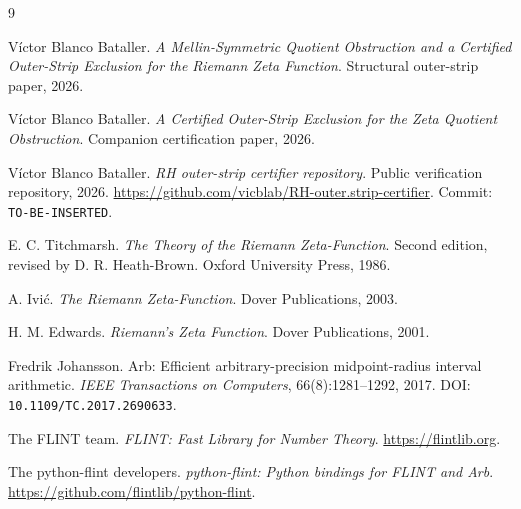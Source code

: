 \documentclass[11pt]{article}
\newcommand{\RepoURL}{\url{https://github.com/vicblab/RH-outer.strip-certifier}}
\begin{document}
\begin{thebibliography}{9}

V\'ictor Blanco Bataller.
\newblock \emph{A Mellin-Symmetric Quotient Obstruction and a Certified Outer-Strip Exclusion for the Riemann Zeta Function}.
\newblock Structural outer-strip paper, 2026.

V\'ictor Blanco Bataller.
\newblock \emph{A Certified Outer-Strip Exclusion for the Zeta Quotient Obstruction}.
\newblock Companion certification paper, 2026.

V\'ictor Blanco Bataller.
\newblock \emph{RH outer-strip certifier repository}.
\newblock Public verification repository, 2026.
\newblock \RepoURL.
\newblock Commit: \texttt{TO-BE-INSERTED}.

E. C. Titchmarsh.
\newblock \emph{The Theory of the Riemann Zeta-Function}.
\newblock Second edition, revised by D. R. Heath-Brown.
\newblock Oxford University Press, 1986.

A. Ivi\'c.
\newblock \emph{The Riemann Zeta-Function}.
\newblock Dover Publications, 2003.

H. M. Edwards.
\newblock \emph{Riemann's Zeta Function}.
\newblock Dover Publications, 2001.

Fredrik Johansson.
\newblock Arb: Efficient arbitrary-precision midpoint-radius interval arithmetic.
\newblock \emph{IEEE Transactions on Computers}, 66(8):1281--1292, 2017.
\newblock DOI: \texttt{10.1109/TC.2017.2690633}.

The FLINT team.
\newblock \emph{FLINT: Fast Library for Number Theory}.
\newblock \url{https://flintlib.org}.

The python-flint developers.
\newblock \emph{python-flint: Python bindings for FLINT and Arb}.
\newblock \url{https://github.com/flintlib/python-flint}.

\end{thebibliography}
\end{document}
